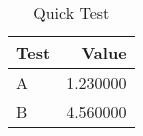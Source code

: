 \documentclass{article}
\begin{document}
\begin{table}
\caption{Quick Test}
\label{tab:quick}
\begin{tabular}{lr}
\toprule
Test & Value \\
\midrule
A & 1.230000 \\
B & 4.560000 \\
\bottomrule
\end{tabular}
\end{table}
\end{document}

